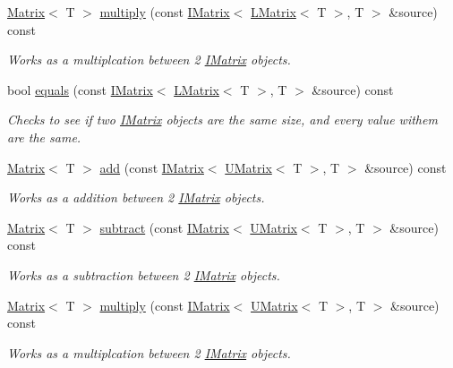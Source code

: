 \begin{DoxyCompactItemize}
\mbox{\hyperlink{class_matrix}{Matrix}}$<$ T $>$ \mbox{\hyperlink{class_u_matrix_a8409112f00cc0220a5ce04ec16b99977}{multiply}} (const \mbox{\hyperlink{class_i_matrix}{I\+Matrix}}$<$ \mbox{\hyperlink{class_l_matrix}{L\+Matrix}}$<$ T $>$, T $>$ \&source) const
\begin{DoxyCompactList}\small\item\em Works as a multiplcation between 2 \mbox{\hyperlink{class_i_matrix}{I\+Matrix}} objects. \end{DoxyCompactList}\item 
bool \mbox{\hyperlink{class_u_matrix_a68c4d5b9cf92b329657205a635294bab}{equals}} (const \mbox{\hyperlink{class_i_matrix}{I\+Matrix}}$<$ \mbox{\hyperlink{class_l_matrix}{L\+Matrix}}$<$ T $>$, T $>$ \&source) const
\begin{DoxyCompactList}\small\item\em Checks to see if two \mbox{\hyperlink{class_i_matrix}{I\+Matrix}} objects are the same size, and every value withem are the same. \end{DoxyCompactList}\item 
\mbox{\hyperlink{class_matrix}{Matrix}}$<$ T $>$ \mbox{\hyperlink{class_u_matrix_ad8d5f4dc3945dbeec02c90db85266c39}{add}} (const \mbox{\hyperlink{class_i_matrix}{I\+Matrix}}$<$ \mbox{\hyperlink{class_u_matrix}{U\+Matrix}}$<$ T $>$, T $>$ \&source) const
\begin{DoxyCompactList}\small\item\em Works as a addition between 2 \mbox{\hyperlink{class_i_matrix}{I\+Matrix}} objects. \end{DoxyCompactList}\item 
\mbox{\hyperlink{class_matrix}{Matrix}}$<$ T $>$ \mbox{\hyperlink{class_u_matrix_a1f16f054b4df60b40751ca260983c2c5}{subtract}} (const \mbox{\hyperlink{class_i_matrix}{I\+Matrix}}$<$ \mbox{\hyperlink{class_u_matrix}{U\+Matrix}}$<$ T $>$, T $>$ \&source) const
\begin{DoxyCompactList}\small\item\em Works as a subtraction between 2 \mbox{\hyperlink{class_i_matrix}{I\+Matrix}} objects. \end{DoxyCompactList}\item 
\mbox{\hyperlink{class_matrix}{Matrix}}$<$ T $>$ \mbox{\hyperlink{class_u_matrix_a55729b6ed8ac7ce6c2ac7baa21c1ea26}{multiply}} (const \mbox{\hyperlink{class_i_matrix}{I\+Matrix}}$<$ \mbox{\hyperlink{class_u_matrix}{U\+Matrix}}$<$ T $>$, T $>$ \&source) const
\begin{DoxyCompactList}\small\item\em Works as a multiplcation between 2 \mbox{\hyperlink{class_i_matrix}{I\+Matrix}} objects. \end{DoxyCompactList}\item 

\end{DoxyCompactItemize}
